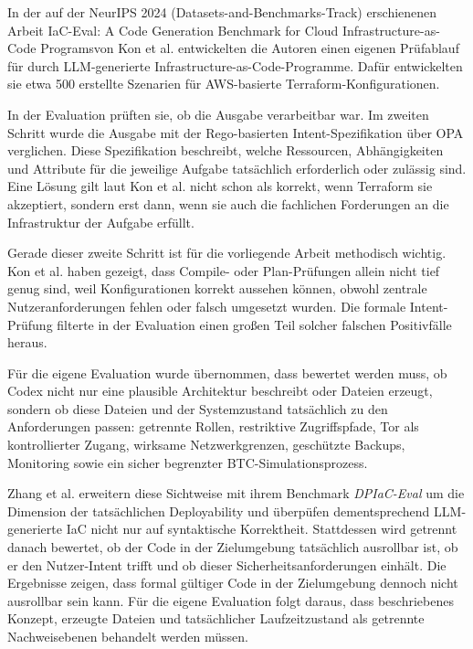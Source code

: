 In der auf der NeurIPS 2024 (Datasets-and-Benchmarks-Track) erschienenen Arbeit \glqq \ac{IaC}-Eval: A Code Generation Benchmark for Cloud Infrastructure-as-Code Programs\grqq von Kon et al. entwickelten die Autoren einen eigenen Prüfablauf für durch \ac{LLM}-generierte Infrastructure-as-Code-Programme. Dafür entwickelten sie etwa 500 erstellte Szenarien für \ac{AWS}-basierte Terraform-Konfigurationen.

In der Evaluation prüften sie, ob die Ausgabe verarbeitbar war. Im zweiten Schritt wurde die Ausgabe mit der Rego-basierten Intent-Spezifikation über \acf{OPA} verglichen. Diese Spezifikation beschreibt, welche Ressourcen, Abhängigkeiten und Attribute für die jeweilige Aufgabe tatsächlich erforderlich oder zulässig sind. Eine Lösung gilt laut Kon et al. nicht schon als korrekt, wenn Terraform sie akzeptiert, sondern erst dann, wenn sie auch die fachlichen Forderungen an die Infrastruktur der Aufgabe erfüllt.\cite{kon2024iaceval}

Gerade dieser zweite Schritt ist für die vorliegende Arbeit methodisch wichtig. Kon et al. haben gezeigt, dass Compile- oder Plan-Prüfungen allein nicht tief genug sind, weil Konfigurationen korrekt aussehen können, obwohl zentrale Nutzeranforderungen fehlen oder falsch umgesetzt wurden. Die formale Intent-Prüfung filterte in der Evaluation einen großen Teil solcher falschen Positivfälle heraus.

Für die eigene Evaluation wurde übernommen, dass bewertet werden muss, ob Codex nicht nur eine plausible Architektur beschreibt oder Dateien erzeugt, sondern ob diese Dateien und der Systemzustand tatsächlich zu den Anforderungen passen: getrennte Rollen, restriktive Zugriffspfade, Tor als kontrollierter Zugang, wirksame Netzwerkgrenzen, geschützte Backups, Monitoring sowie ein sicher begrenzter \ac{BTC}-Simulationsprozess.

Zhang et al. erweitern diese Sichtweise mit ihrem Benchmark \emph{DPIaC-Eval} um die Dimension der tatsächlichen Deployability und überpüfen dementsprechend \ac{LLM}-generierte \ac{IaC} nicht nur auf syntaktische Korrektheit. Stattdessen wird getrennt danach bewertet, ob der Code in der Zielumgebung tatsächlich ausrollbar ist, ob er den Nutzer-Intent trifft und ob dieser Sicherheitsanforderungen einhält. Die Ergebnisse zeigen, dass formal gültiger Code in der Zielumgebung dennoch nicht ausrollbar sein kann.\cite{zhang2025deployabilitycentriciac} 
Für die eigene Evaluation folgt daraus, dass beschriebenes Konzept, erzeugte Dateien und tatsächlicher Laufzeitzustand als getrennte Nachweisebenen behandelt werden müssen.

